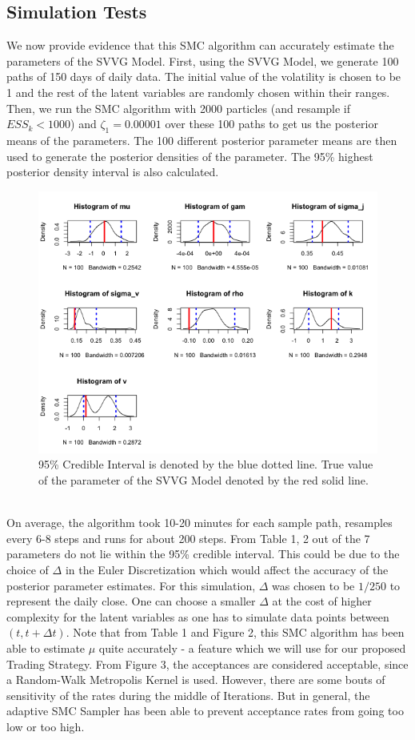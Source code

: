 \documentclass[12pt]{article}
\theoremstyle{definition}
\begin{document}
\subsection{Simulation Tests}
We now provide evidence that this SMC algorithm can accurately estimate the parameters of the SVVG Model. First, using the SVVG Model, we generate 100 paths of 150 days of daily data. The initial value of the volatility is chosen to be 1 and the rest of the latent variables are randomly chosen within their ranges. Then, we run the SMC algorithm with 2000 particles (and resample if $ESS_{k}<1000$) and $\zeta_{1}=0.00001$ over these 100 paths to get us the posterior means of the parameters. The 100 different posterior parameter means are then used to generate the posterior densities of the parameter. The 95\% highest posterior density interval is also calculated.  \\
\begin{figure}
\includegraphics[scale=0.75]{density_plots}
\caption{95\% Credible Interval is denoted by the blue dotted line. True value of the parameter of the SVVG Model denoted by the red solid line.}
\end{figure}
\\
On average, the algorithm took 10-20 minutes for each sample path, resamples every 6-8 steps and runs for about 200 steps. From Table 1, 2 out of the 7 parameters do not lie within the 95\% credible interval. This could be due to the choice of $\Delta$ in the Euler Discretization which would affect the accuracy of the posterior parameter estimates. For this simulation, $\Delta$ was chosen to be $1/250$ to represent the daily close. One can choose a smaller $\Delta$ at the cost of higher complexity for the latent variables as one has to simulate data points between $(t,t+\Delta t)$. Note that from Table 1 and Figure 2, this SMC algorithm has been able to estimate $\mu$  quite accurately - a feature which we will use for our proposed Trading Strategy. From Figure 3, the acceptances are considered acceptable, since a Random-Walk Metropolis Kernel is used. However, there are some bouts of sensitivity of the rates during the middle of Iterations. But in general, the adaptive SMC Sampler has been able to prevent acceptance rates from going too low or too high.
\end{document}
